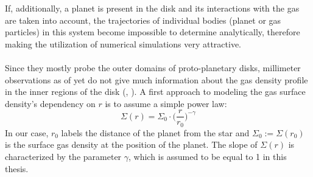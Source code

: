     If, additionally, a planet is present in the disk 
    and its interactions with the gas are taken into account, the trajectories 
    of individual bodies (planet or gas particles) in this system become 
    impossible to determine analytically, therefore making the utilization
    of numerical simulations very attractive.
    \\ %
    \\
    Since they mostly probe the outer domains of proto-planetary 
    disks, millimeter observations as of yet do not give much information about 
    the gas density profile in the inner regions of the disk
    (\citeauthor{Dullemond_2010}, \citeyear{Dullemond_2010}). 
    A first approach to modeling the gas
    surface density's dependency on $r$ is to assume a simple power law:
    \begin{equation}
      \Sigma(r)=\Sigma_0\cdot\bigg(\frac{r}{r_0}\bigg)^{-\gamma}
      \label{eq:surface_density_as_fct_of_r}
    \end{equation}
    In our case, $r_0$ labels the distance of the planet from the star and 
    $\Sigma_0:=\Sigma(r_0)$ is the surface gas density at the position of the 
    planet. The slope of $\Sigma(r)$ is characterized by the parameter $\gamma$, 
    which is assumed to be equal to 1 in this thesis.
    \\
    \\
